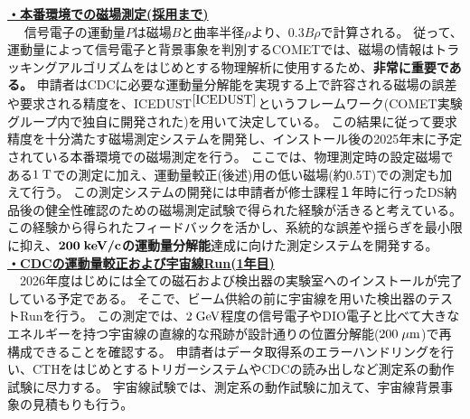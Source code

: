 \documentclass[11pt,a4j,dvipdfmx]{jarticle} 					%
\newcommand{\研究課題名}{COMET Phase-Iに向けたエンジニアリングランおよびその物理解析}
\newcommand{\研究機関名}{大阪大学}
\newcommand{\研究代表者氏名}{高見 翔太   }
\begin{document}
%
\noindent
\uline{\textbf{・本番環境での磁場測定(採用まで)}}\\
信号電子の運動量$P$は磁場$B$と曲率半径$\rho$より、$0.3B\rho$で計算される。
従って、運動量によって信号電子と背景事象を判別するCOMETでは、磁場の情報はトラッキングアルゴリズムをはじめとする物理解析に使用するため、\textbf{非常に重要である。}
申請者はCDCに必要な運動量分解能を実現する上で許容される磁場の誤差や要求される精度を、ICEDUST$^{\cite{ICEDUST}}$というフレームワーク(COMET実験グループ内で独自に開発された)を用いて決定している。
この結果に従って要求精度を十分満たす磁場測定システムを開発し、インストール後の2025年末に予定されている本番環境での磁場測定を行う。
ここでは、物理測定時の設定磁場である$1\;\rm{T}$での測定に加え、運動量較正(後述)用の低い磁場(約0.5\;\rm{T})での測定も加えて行う。
この測定システムの開発には申請者が修士課程１年時に行ったDS納品後の健全性確認のための磁場測定試験で得られた経験が活きると考えている。この経験から得られたフィードバックを活かし、系統的な誤差や揺らぎを最小限に抑え、$\mathbf{200\;\rm{\textbf{keV/c}}}$\textbf{の運動量分解能}達成に向けた測定システムを開発する。
\\
\noindent
\uline{\textbf{・CDCの運動量較正および宇宙線Run(1年目)}}\\
　2026年度はじめには全ての磁石および検出器の実験室へのインストールが完了している予定である。
そこで、ビーム供給の前に宇宙線を用いた検出器のテストRunを行う。
この測定では、$2\;\rm{GeV}$程度の信号電子やDIO電子と比べて大きなエネルギーを持つ宇宙線の直線的な飛跡が設計通りの位置分解能($200\;\rm{\mu m}$)で再構成できることを確認する。
申請者はデータ取得系のエラーハンドリングを行い、CTHをはじめとするトリガーシステムやCDCの読み出しなど測定系の動作試験に尽力する。
宇宙線試験では、測定系の動作試験に加えて、宇宙線背景事象の見積もりも行う。
\end{document}
